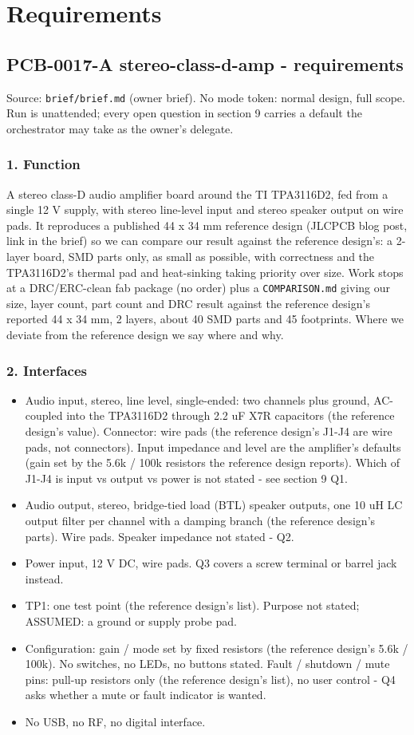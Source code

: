\documentclass[11pt,a4paper]{article}
\begin{document}
\section{Requirements}
\subsection*{PCB-0017-A stereo-class-d-amp - requirements}
Source: \texttt{brief/brief.md} (owner brief). No mode token: normal design, full scope. Run is unattended; every open question in section 9 carries a default the orchestrator may take as the owner's delegate.

\subsubsection*{1. Function}
A stereo class-D audio amplifier board around the TI TPA3116D2, fed from a single 12 V supply, with stereo line-level input and stereo speaker output on wire pads. It reproduces a published 44 x 34 mm reference design (JLCPCB blog post, link in the brief) so we can compare our result against the reference design's: a 2-layer board, SMD parts only, as small as possible, with correctness and the TPA3116D2's thermal pad and heat-sinking taking priority over size. Work stops at a DRC/ERC-clean fab package (no order) plus a \texttt{COMPARISON.md} giving our size, layer count, part count and DRC result against the reference design's reported 44 x 34 mm, 2 layers, about 40 SMD parts and 45 footprints. Where we deviate from the reference design we say where and why.

\subsubsection*{2. Interfaces}
\begin{itemize}
\item Audio input, stereo, line level, single-ended: two channels plus ground, AC-coupled into the
TPA3116D2 through 2.2 uF X7R capacitors (the reference design's value). Connector: wire pads (the reference design's J1-J4
are wire pads, not connectors). Input impedance and level are the amplifier's defaults
(gain set by the 5.6k / 100k resistors the reference design reports). Which of J1-J4 is input vs output vs
power is not stated - see section 9 Q1.
\item Audio output, stereo, bridge-tied load (BTL) speaker outputs, one 10 uH LC output filter per
channel with a damping branch (the reference design's parts). Wire pads. Speaker impedance not stated - Q2.
\item Power input, 12 V DC, wire pads. Q3 covers a screw terminal or barrel jack instead.
\item TP1: one test point (the reference design's list). Purpose not stated; ASSUMED: a ground or supply probe pad.
\item Configuration: gain / mode set by fixed resistors (the reference design's 5.6k / 100k). No switches, no LEDs,
no buttons stated. Fault / shutdown / mute pins: pull-up resistors only (the reference design's list), no user
control - Q4 asks whether a mute or fault indicator is wanted.
\item No USB, no RF, no digital interface.
\end{itemize}
\end{document}
